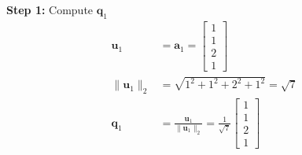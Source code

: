 \textbf{Step 1:} Compute $\mathbf{q}_1$
\begin{align*}
    \mathbf{u}_1       & = \mathbf{a}_1 =
    \begin{bmatrix}
        1 \\ 1 \\ 2 \\ 1
    \end{bmatrix}                                                                     \\
    \|\mathbf{u}_1\|_2 & = \sqrt{1^2 + 1^2 + 2^2 + 1^2} = \sqrt{7}                      \\
    \mathbf{q}_1       & = \frac{\mathbf{u}_1}{\|\mathbf{u}_1\|_2} = \frac{1}{\sqrt{7}}
    \begin{bmatrix}
        1 \\ 1 \\ 2 \\ 1
    \end{bmatrix}
\end{align*}

